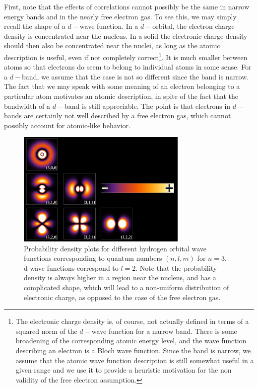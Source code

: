 \documentclass[10pt, twocolumn, twoside]{article}
\begin{document}
First, note that the effects of correlations cannot possibly be the same in narrow energy bands and in the nearly free electron gas. To see this, we may simply  recall the shape of a $d-$wave function. In a $d-$orbital, the electron charge density is concentrated near the nucleus. In a solid the electronic charge density should then also be concentrated near the nuclei, as long as the atomic description is useful, even if not completely correct\footnote{The electronic charge density is, of course, not actually defined in terms of a squared norm of the $d-$wave function for a narrow band. There is some broadening of the corresponding atomic energy level, and the wave function describing an electron is a Bloch wave function. Since the band is narrow, we assume that the atomic wave function description is still somewhat useful in a given range and we use it to provide a heuristic motivation for the non validity of the free electron assumption.}. It is much smaller between atoms so that electrons do seem to belong to individual atoms in some sense. For a $d-$band, we assume that the case is not so different since the band is narrow. The fact that we may speak with some meaning of an electron belonging to a particular atom motivates an atomic description, in spite of the fact that the bandwidth of a $d-$band is still appreciable. The point is that electrons in $d-$bands are certainly not well described by a free electron gas, which cannot possibly account for atomic-like behavior.

\begin{figure}[ht!]\label{fig:hydrogenWF}
\centering
\includegraphics[width = 8.2cm]{Hydrogen_Density_Plots.png}
\caption{Probability density plots for different hydrogen orbital wave functions corresponding to quantum numbers $(n, l, m)$ for $n = 3$. d-wave functions correspond to $l=2$. Note that the probability density is always higher in a region near the nucleus, and has a complicated shape, which will lead to a non-uniform distribution of electronic charge, as opposed to the case of the free electron gas.}
\end{figure}
\end{document}
